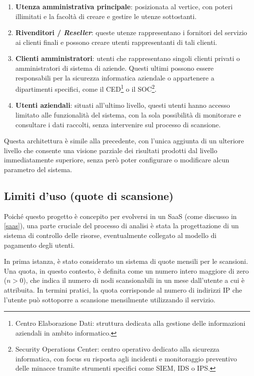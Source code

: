 \begin{enumerate}
    \item \textbf{Utenza amministrativa principale}: posizionata al vertice, con poteri illimitati e la facoltà di creare e gestire le utenze sottostanti.
    \item \textbf{Rivenditori / \emph{Reseller}}: queste utenze rappresentano i fornitori del servizio ai clienti finali e possono creare utenti rappresentanti di tali clienti.
    \item \textbf{Clienti amministratori}: utenti che rappresentano singoli clienti privati o amministratori di sistema di aziende. Questi ultimi possono essere responsabili per la sicurezza informatica aziendale o appartenere a dipartimenti specifici, come il CED\footnote{Centro Elaborazione Dati: struttura dedicata alla gestione delle informazioni aziendali in ambito informatico.} o il SOC\footnote{Security Operations Center: centro operativo dedicato alla sicurezza informatica, con focus su risposta agli incidenti e monitoraggio preventivo delle minacce tramite strumenti specifici come SIEM, IDS o IPS.}.
    \item \textbf{Utenti aziendali}: situati all'ultimo livello, questi utenti hanno accesso limitato alle funzionalità del sistema, con la sola possibilità di monitorare e consultare i dati raccolti, senza intervenire sul processo di scansione.
\end{enumerate}

Questa architettura è simile alla precedente, con l'unica aggiunta di un ulteriore livello che consente una visione parziale dei risultati prodotti dal livello immediatamente superiore, senza però poter configurare o modificare alcun parametro del sistema.

\subsection{Limiti d'uso (quote di scansione)}
\label{quote-spec}
Poiché questo progetto è concepito per evolversi in un SaaS (come discusso in \ref{saas}), una parte cruciale del processo di analisi è stata la progettazione di un sistema di controllo delle risorse, eventualmente collegato al modello di pagamento degli utenti.

In prima istanza, è stato considerato un sistema di quote mensili per le scansioni. Una quota, in questo contesto, è definita come un numero intero maggiore di zero ($n > 0$), che indica il numero di nodi scansionabili in un mese dall'utente a cui è attribuita. In termini pratici, la quota corrisponde al numero di indirizzi IP che l'utente può sottoporre a scansione mensilmente utilizzando il servizio.

